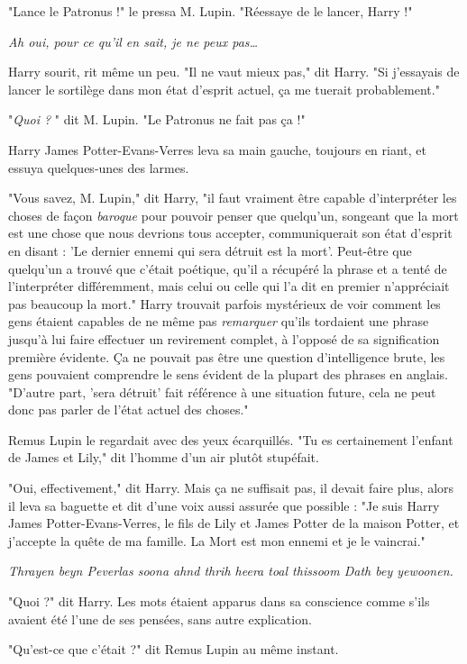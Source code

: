 "Lance le Patronus !" le pressa M. Lupin. "Réessaye de le lancer, Harry !"

\emph{Ah oui, pour ce qu'il en sait, je ne peux pas…} 

Harry sourit, rit même un peu. "Il ne vaut mieux pas," dit Harry. "Si j'essayais de lancer le sortilège dans mon état d'esprit actuel, ça me tuerait probablement."

"\emph{Quoi ?} " dit M. Lupin. "Le Patronus ne fait pas ça !"

Harry James Potter-Evans-Verres leva sa main gauche, toujours en riant, et essuya quelques-unes des larmes.

"Vous savez, M. Lupin," dit Harry, "il faut vraiment être capable d'interpréter les choses de façon \emph{baroque}  pour pouvoir penser que quelqu'un, songeant que la mort est une chose que nous devrions tous accepter, communiquerait son état d'esprit en disant : 'Le dernier ennemi qui sera détruit est la mort'. Peut-être que quelqu'un a trouvé que c'était poétique, qu'il a récupéré la phrase et a tenté de l'interpréter différemment, mais celui ou celle qui l'a dit en premier n'appréciait pas beaucoup la mort." Harry trouvait parfois mystérieux de voir comment les gens étaient capables de ne même pas \emph{remarquer}  qu'ils tordaient une phrase jusqu'à lui faire effectuer un revirement complet, à l'opposé de sa signification première évidente. Ça ne pouvait pas être une question d'intelligence brute, les gens pouvaient comprendre le sens évident de la plupart des phrases en anglais. "D'autre part, 'sera détruit' fait référence à une situation future, cela ne peut donc pas parler de l'état actuel des choses."

Remus Lupin le regardait avec des yeux écarquillés. "Tu es certainement l'enfant de James et Lily," dit l'homme d'un air plutôt stupéfait.

"Oui, effectivement," dit Harry. Mais ça ne suffisait pas, il devait faire plus, alors il leva sa baguette et dit d'une voix aussi assurée que possible : "Je suis Harry James Potter-Evans-Verres, le fils de Lily et James Potter de la maison Potter, et j'accepte la quête de ma famille. La Mort est mon ennemi et je le vaincrai."

\emph{Thrayen beyn Peverlas soona ahnd thrih heera toal thissoom Dath bey yewoonen.} 

"Quoi ?" dit Harry. Les mots étaient apparus dans sa conscience comme s'ils avaient été l'une de ses pensées, sans autre explication.

"Qu'est-ce que c'était ?" dit Remus Lupin au même instant.

